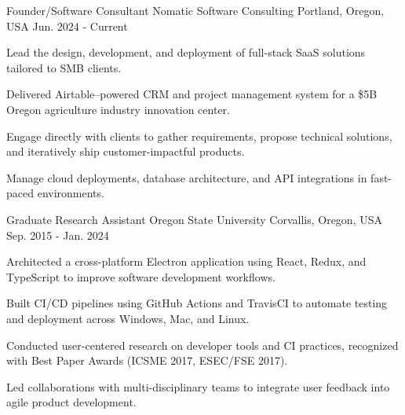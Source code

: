
\begin{cventries}

\cventry
    {Founder/Software Consultant} %
    {Nomatic Software Consulting} %
    {Portland, Oregon, USA} %
    {Jun. 2024 - Current} %
    {
      \begin{cvitems} %
        \item {Lead the design, development, and deployment of full-stack SaaS solutions tailored to SMB clients.}
        \item {Delivered Airtable--powered CRM and project management system for a \$5B Oregon agriculture industry innovation center.}
        \item {Engage directly with clients to gather requirements, propose technical solutions, and iteratively ship customer-impactful products.}
        \item {Manage cloud deployments, database architecture, and API integrations in fast-paced environments.}
      \end{cvitems}
    }
    
  \cventry
    {Graduate Research Assistant} %
    {Oregon State University} %
    {Corvallis, Oregon, USA} %
    {Sep. 2015 - Jan. 2024} %
    {
      \begin{cvitems} %
        \item {Architected a cross-platform Electron application using React, Redux, and TypeScript to improve software development workflows.}
        \item {Built CI/CD pipelines using GitHub Actions and TravisCI to automate testing and deployment across Windows, Mac, and Linux.}
        \item {Conducted user-centered research on developer tools and CI practices, recognized with Best Paper Awards (ICSME 2017, ESEC/FSE 2017).}
        \item {Led collaborations with multi-disciplinary teams to integrate user feedback into agile product development.}
      \end{cvitems}
    }


\end{cventries}
